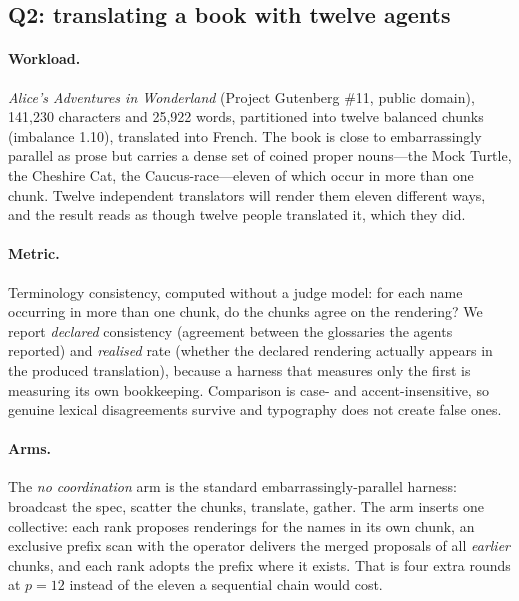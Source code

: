 \subsection{Q2: translating a book with twelve agents}
\label{sec:eval-translation}

\paragraph{Workload.} \emph{Alice's Adventures in Wonderland} (Project
Gutenberg \#11, public domain), 141{,}230 characters and 25{,}922 words,
partitioned into twelve balanced chunks (imbalance 1.10), translated into
French. The book is close to embarrassingly parallel as prose but carries a
dense set of coined proper nouns---the Mock Turtle, the Cheshire Cat, the
Caucus-race---eleven of which occur in more than one chunk. Twelve
independent translators will render them eleven different ways, and the
result reads as though twelve people translated it, which they did.

\paragraph{Metric.} Terminology consistency, computed without a judge model:
for each name occurring in more than one chunk, do the chunks agree on the
rendering? We report \emph{declared} consistency (agreement between the
glossaries the agents reported) and \emph{realised} rate (whether the
declared rendering actually appears in the produced translation), because a
harness that measures only the first is measuring its own bookkeeping.
Comparison is case- and accent-insensitive, so genuine lexical
disagreements survive and typography does not create false ones.

\paragraph{Arms.} The \emph{no coordination} arm is the standard
embarrassingly-parallel harness: broadcast the spec, scatter the chunks,
translate, gather. The \emph{} arm inserts one collective: each
rank proposes renderings for the names in its own chunk, an exclusive prefix
scan with the  operator delivers the merged proposals of all
\emph{earlier} chunks, and each rank adopts the prefix where it exists. That
is four extra rounds at $p=12$ instead of the eleven a sequential chain
would cost.



